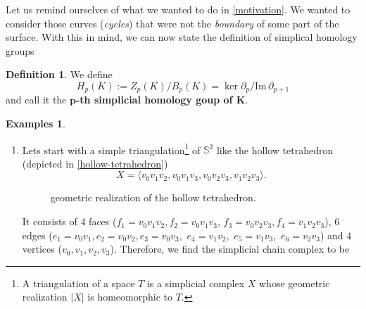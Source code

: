 \documentclass[draft,toc=bib]{scrartcl}
\theoremstyle{plain}
\theoremstyle{definition}
\newtheorem	{definition}[theorem]{Definition}
\newtheorem{examples}[theorem]{Examples}
\theoremstyle{remark}
\newcommand{\Z}{\mathbb{Z}}
\newcommand{\Sp}{\mathbb{S}}
\newcommand{\im}{\mathrm{Im}\,}
\begin{document}
Let us remind ourselves of what we wanted to do in \autoref{motivation}. We wanted to consider those curves (\emph{cycles}) that were not the \emph{boundary} of some part of the surface. With this in mind, we can now state the definition of simplical homology groups

\begin{definition}
	We define \[
	H_p(K):=Z_p(K)/B_p(K)=\ker \partial_p/\im \partial_{p+1}
	\]
	and call it the \textbf{$\mathbf{p}$-th simplicial homology goup of $\mathbf{K}$}.
\end{definition}

\begin{examples}\mbox{}
	\begin{enumerate}
		\item Lets start with a simple triangulation\footnote{A triangulation of a space $T$ is a simplicial complex $X$ whose geometric realization $|X|$ is homeomorphic to $T$.}
		 of $\Sp^2$ like the hollow tetrahedron (depicted in \autoref{hollow-tetrahedron}) \[X=\langle v_0v_1v_2,v_0v_1v_3,v_0v_2v_3,v_1v_2v_3 \rangle. \]
			 	
		 	\begin{figure}\centering
		 		\caption{geometric realization of the hollow tetrahedron.\label{hollow-tetrahedron}}
		 	\end{figure}
	 It consists of 4 faces ($f_1=v_0v_1v_2, f_2=v_0v_1v_3$, $f_3=v_0v_2v_3, f_4=v_1v_2v_3$), 6 edges ($e_1=v_0v_1, e_2=v_0v_2, e_3=v_0v_3,$ $ e_4=v_1v_2, $ $e_5=v_1v_3, $ $e_6=v_2v_3$) and 4 vertices ($v_0,v_1,v_2,v_3$). Therefore, we find the simplicial chain complex to be
 

\end{enumerate}
\end{examples}
\end{document}
